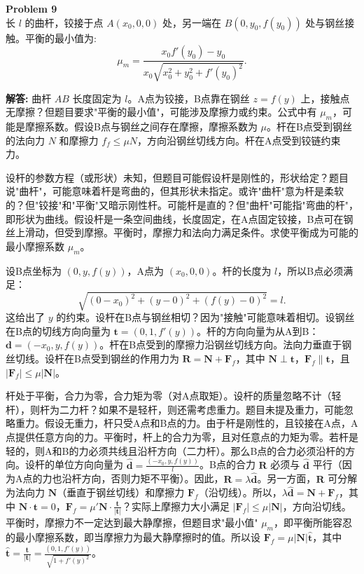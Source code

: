 \documentclass[12pt, a4paper, oneside]{ctexart}
\newenvironment{solution}{\par\noindent\textbf{解答:}\quad}{\par}
\begin{document}
\begin{mdframed}[backgroundcolor=gray!10, linewidth=0pt]
    \textbf{Problem 9} \\
    长 \(l\) 的曲杆，铰接于点 \(A(x_0,0,0)\) 处，另一端在 \(B(0, y_0, f(y_0))\) 处与钢丝接触。平衡的最小值为:
    \[
    \mu_m = \frac{x_0 f'(y_0) - y_0}{x_0 \sqrt{x_0^2 + y_0^2 + f'(y_0)^2}}.
    \]
\end{mdframed}
\begin{solution}
    曲杆 \(AB\) 长度固定为 \(l\)。A点为铰接，B点靠在钢丝 \(z = f(y)\) 上，接触点无摩擦？但题目要求"平衡的最小值"，可能涉及摩擦力或约束。公式中有 \(\mu_m\)，可能是摩擦系数。假设B点与钢丝之间存在摩擦，摩擦系数为 \(\mu\)。杆在B点受到钢丝的法向力 \(N\) 和摩擦力 \(f_f \leq \mu N\)，方向沿钢丝切线方向。杆在A点受到铰链约束力。
    
    设杆的参数方程（或形状）未知，但题目可能假设杆是刚性的，形状给定？题目说"曲杆"，可能意味着杆是弯曲的，但其形状未指定。或许"曲杆"意为杆是柔软的？但"铰接"和"平衡"又暗示刚性杆。可能杆是直的？但"曲杆"可能指"弯曲的杆"，即形状为曲线。假设杆是一条空间曲线，长度固定，在A点固定铰接，B点可在钢丝上滑动，但受到摩擦。平衡时，摩擦力和法向力满足条件。求使平衡成为可能的最小摩擦系数 \(\mu_m\)。
    
    设B点坐标为 \((0, y, f(y))\)，A点为 \((x_0, 0, 0)\)。杆的长度为 \(l\)，所以B点必须满足：
    \[
    \sqrt{(0 - x_0)^2 + (y - 0)^2 + (f(y) - 0)^2} = l.
    \]
    这给出了 \(y\) 的约束。设杆在B点与钢丝相切？因为"接触"可能意味着相切。设钢丝在B点的切线方向向量为 \(\mathbf{t} = (0, 1, f'(y))\)。杆的方向向量为从A到B：\(\mathbf{d} = (-x_0, y, f(y))\)。杆在B点受到的摩擦力沿钢丝切线方向。法向力垂直于钢丝切线。设杆在B点受到钢丝的作用力为 \(\mathbf{R} = \mathbf{N} + \mathbf{F}_f\)，其中 \(\mathbf{N} \perp \mathbf{t}\)，\(\mathbf{F}_f \parallel \mathbf{t}\)，且 \(|\mathbf{F}_f| \leq \mu |\mathbf{N}|\)。
    
    杆处于平衡，合力为零，合力矩为零（对A点取矩）。设杆的质量忽略不计（轻杆），则杆为二力杆？如果不是轻杆，则还需考虑重力。题目未提及重力，可能忽略重力。假设无重力，杆只受A点和B点的力。由于杆是刚性的，且铰接在A点，A点提供任意方向的力。平衡时，杆上的合力为零，且对任意点的力矩为零。若杆是轻的，则A和B的力必须共线且沿杆方向（二力杆）。那么B点的合力必须沿杆的方向。设杆的单位方向向量为 \(\hat{\mathbf{d}} = \frac{(-x_0, y, f(y))}{l}\)。B点的合力 \(\mathbf{R}\) 必须与 \(\hat{\mathbf{d}}\) 平行（因为A点的力也沿杆方向，否则力矩不平衡）。因此，\(\mathbf{R} = \lambda \hat{\mathbf{d}}\)。另一方面，\(\mathbf{R}\) 可分解为法向力 \(\mathbf{N}\)（垂直于钢丝切线）和摩擦力 \(\mathbf{F}_f\)（沿切线）。所以，\(\lambda \hat{\mathbf{d}} = \mathbf{N} + \mathbf{F}_f\)，其中 \(\mathbf{N} \cdot \mathbf{t} = 0\)，\(\mathbf{F}_f = \mu' \mathbf{N} \cdot \frac{\mathbf{t}}{|\mathbf{t}|}\)？实际上摩擦力大小满足 \(|\mathbf{F}_f| \leq \mu |\mathbf{N}|\)，方向沿切线。平衡时，摩擦力不一定达到最大静摩擦，但题目求"最小值" \(\mu_m\)，即平衡所能容忍的最小摩擦系数，即当摩擦力为最大静摩擦时的值。所以设 \(\mathbf{F}_f = \mu |\mathbf{N}| \hat{\mathbf{t}}\)，其中 \(\hat{\mathbf{t}} = \frac{\mathbf{t}}{|\mathbf{t}|} = \frac{(0,1,f'(y))}{\sqrt{1+f'(y)^2}}\)。
    

\end{solution}
\end{document}
